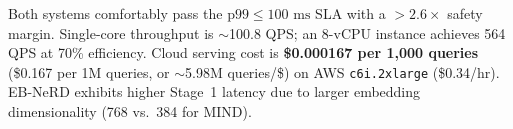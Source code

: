 \documentclass[11pt,a4paper]{article}
\begin{document}
Both systems comfortably pass the $\text{p99} \le 100\text{ ms}$ SLA with a $>2.6\times$ safety margin. Single-core throughput is $\sim$100.8 QPS; an 8-vCPU instance achieves 564 QPS at 70\% efficiency. Cloud serving cost is \textbf{\$0.000167 per 1,000 queries} (\$0.167 per 1M queries, or $\sim$5.98M queries/\$) on AWS \texttt{c6i.2xlarge} (\$0.34/hr). EB-NeRD exhibits higher Stage~1 latency due to larger embedding dimensionality (768 vs.\ 384 for MIND).




\end{document}
